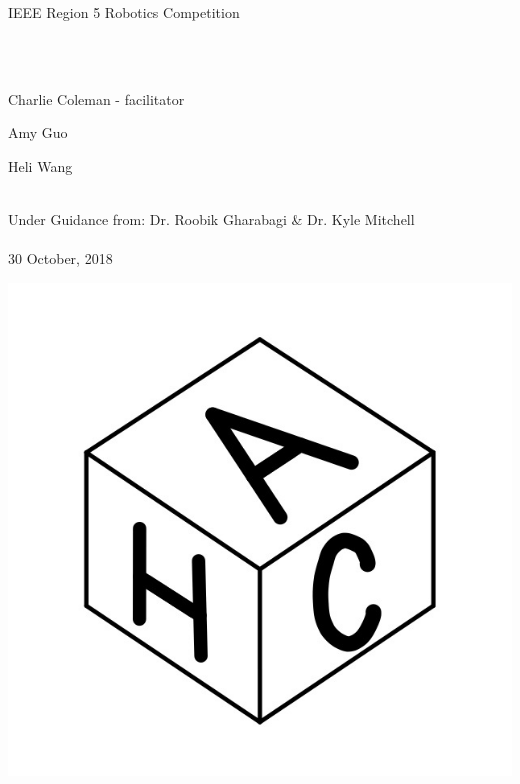 \documentclass[12pt]{article}
\begin{document}
\vspace*{\fill}
\begin{center}

\begin{LARGE}IEEE Region 5 Robotics Competition\end{LARGE}~\\~\\


\begin{large}
Charlie Coleman - facilitator 

Amy Guo

Heli Wang\\~\\
\end{large}

Under Guidance from: Dr. Roobik Gharabagi \& Dr. Kyle Mitchell\\~\\

30 October, 2018

\includegraphics[scale=0.3]{logo}


\end{center}
\vspace*{\fill}
\end{document}
